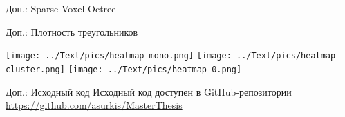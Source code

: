 \begin{frame}{Доп.: Sparse Voxel Octree}
\begin{minipage}{.2\textwidth}
    \end{minipage}
\end{frame}

\begin{frame}{Доп.: Плотность треугольников}
    \begin{center}
        \texttt{[image: ../Text/pics/heatmap-mono.png]}
        \texttt{[image: ../Text/pics/heatmap-cluster.png]}
        \texttt{[image: ../Text/pics/heatmap-0.png]}
    \end{center}
\end{frame}

\begin{frame}{Доп.: Исходный код}
    Исходный код доступен в GitHub-репозитории\\
    \url{https://github.com/asurkis/MasterThesis}

    \bigskip

    \begin{center}
    \end{center}
\end{frame}
